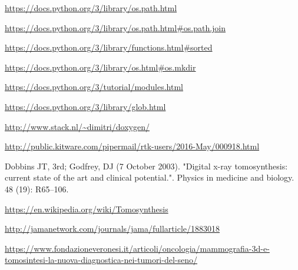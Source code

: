 \documentclass[a4paper,12pt, doubleside]{report}
\begin{document}
\begin{thebibliography}{1}
        \url{https://docs.python.org/3/library/os.path.html}

        \url{https://docs.python.org/3/library/os.path.html#os.path.join}

        \url{https://docs.python.org/3/library/functions.html#sorted}    
        
        \url{https://docs.python.org/3/library/os.html#os.mkdir}

        \url{https://docs.python.org/3/tutorial/modules.html}

        \url{https://docs.python.org/3/library/glob.html}
    

        
        \url{http://www.stack.nl/~dimitri/doxygen/}
        
        \url{http://public.kitware.com/pipermail/rtk-users/2016-May/000918.html}
            
        Dobbins JT, 3rd; Godfrey, DJ (7 October 2003). "Digital x-ray tomosynthesis: current state of the art and clinical potential.". Physics in medicine and biology. 48 (19): R65–106.
        
        \url{https://en.wikipedia.org/wiki/Tomosynthesis}
        
        \url{http://jamanetwork.com/journals/jama/fullarticle/1883018}
    
        \url{https://www.fondazioneveronesi.it/articoli/oncologia/mammografia-3d-e-tomosintesi-la-nuova-diagnostica-nei-tumori-del-seno/}
            
    \end{thebibliography}
\end{document}
